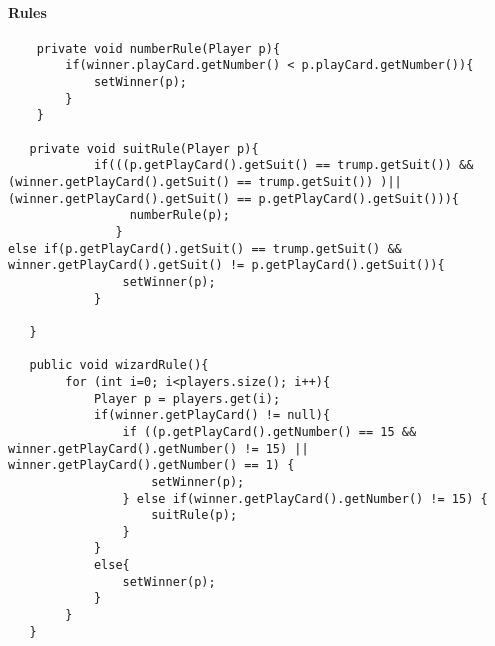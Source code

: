 \paragraph{Rules}
\begin{verbatim}
    private void numberRule(Player p){
        if(winner.playCard.getNumber() < p.playCard.getNumber()){
            setWinner(p);
        }
    }

   private void suitRule(Player p){
            if(((p.getPlayCard().getSuit() == trump.getSuit()) && (winner.getPlayCard().getSuit() == trump.getSuit()) )|| (winner.getPlayCard().getSuit() == p.getPlayCard().getSuit())){
                 numberRule(p);
               }
else if(p.getPlayCard().getSuit() == trump.getSuit() && winner.getPlayCard().getSuit() != p.getPlayCard().getSuit()){
                setWinner(p);
            }

   }

   public void wizardRule(){
        for (int i=0; i<players.size(); i++){
            Player p = players.get(i);
            if(winner.getPlayCard() != null){
                if ((p.getPlayCard().getNumber() == 15 && winner.getPlayCard().getNumber() != 15) || winner.getPlayCard().getNumber() == 1) {
                    setWinner(p);
                } else if(winner.getPlayCard().getNumber() != 15) {
                    suitRule(p);
                }
            }
            else{
                setWinner(p);
            }
        }
   }
\end{verbatim}
